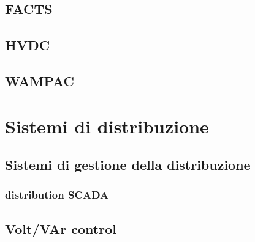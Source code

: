 \subsection{FACTS}
\subsection{HVDC}
\subsection{WAMPAC}


\section{Sistemi di distribuzione}

\subsection{Sistemi di gestione della distribuzione}
\subsubsection{distribution SCADA}
\subsection{Volt/VAr control}


